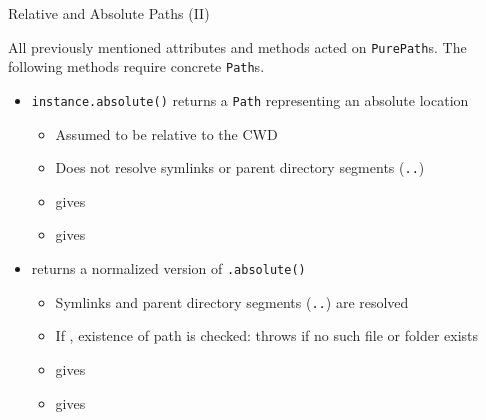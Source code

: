 \begin{frame}[fragile]{Relative and Absolute Paths (II)}
%
\begin{defbox}
\scriptsize
All previously mentioned attributes and methods acted on \texttt{PurePath}s. The following methods require concrete \texttt{Path}s.
\end{defbox}
%
\begin{itemize}
\item \texttt{instance.absolute()} returns a \texttt{Path} representing an absolute location
	\begin{itemize}
	\item Assumed to be relative to the CWD
	\item Does not resolve symlinks or parent directory segments (\texttt{..})
	\item {} gives 
	\item {} gives 
	\end{itemize}
\item {} returns a normalized version of \texttt{.absolute()}
	\begin{itemize}
	\item Symlinks and parent directory segments (\texttt{..}) are resolved
	\item If , existence of path is checked: throws  if no such file or folder exists
	\item {} gives 
	\item {} gives 
	\end{itemize}
\end{itemize}
%
\end{frame}


